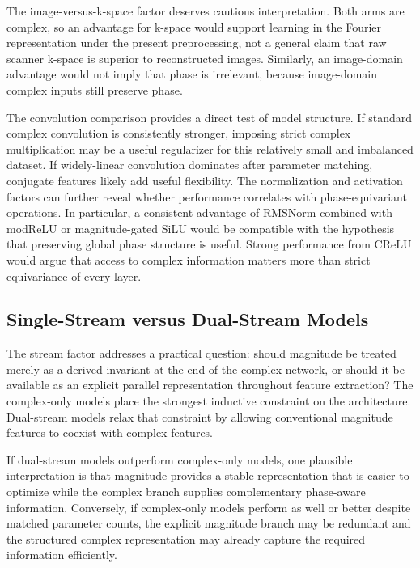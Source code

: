 \documentclass[journal]{IEEEtran}
\begin{document}
The image-versus-k-space factor deserves cautious interpretation. Both arms are complex, so an advantage for k-space would support learning in the Fourier representation under the present preprocessing, not a general claim that raw scanner k-space is superior to reconstructed images. Similarly, an image-domain advantage would not imply that phase is irrelevant, because image-domain complex inputs still preserve phase.

The convolution comparison provides a direct test of model structure. If standard complex convolution is consistently stronger, imposing strict complex multiplication may be a useful regularizer for this relatively small and imbalanced dataset. If widely-linear convolution dominates after parameter matching, conjugate features likely add useful flexibility. The normalization and activation factors can further reveal whether performance correlates with phase-equivariant operations. In particular, a consistent advantage of RMSNorm combined with modReLU or magnitude-gated SiLU would be compatible with the hypothesis that preserving global phase structure is useful. Strong performance from CReLU would argue that access to complex information matters more than strict equivariance of every layer.

\subsection{Single-Stream versus Dual-Stream Models}
The stream factor addresses a practical question: should magnitude be treated merely as a derived invariant at the end of the complex network, or should it be available as an explicit parallel representation throughout feature extraction? The complex-only models place the strongest inductive constraint on the architecture. Dual-stream models relax that constraint by allowing conventional magnitude features to coexist with complex features.


If dual-stream models outperform complex-only models, one plausible interpretation is that magnitude provides a stable representation that is easier to optimize while the complex branch supplies complementary phase-aware information. Conversely, if complex-only models perform as well or better despite matched parameter counts, the explicit magnitude branch may be redundant and the structured complex representation may already capture the required information efficiently.
\end{document}
